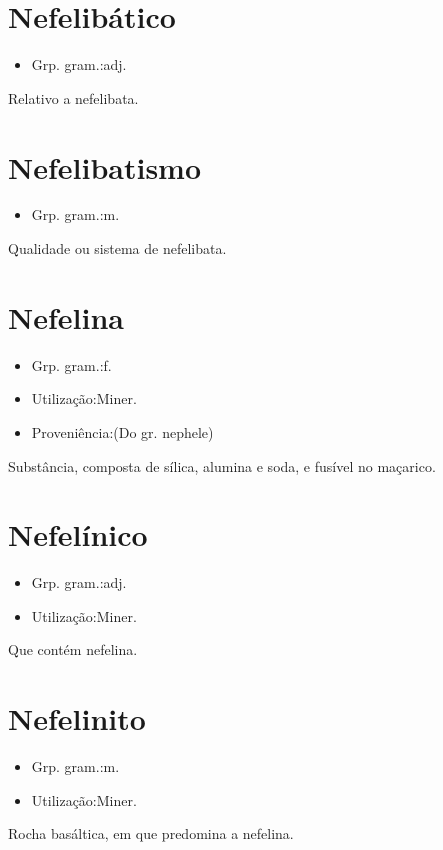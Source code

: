 \section{Nefelibático}
\begin{itemize}
\item {Grp. gram.:adj.}
\end{itemize}
Relativo a nefelibata.
\section{Nefelibatismo}
\begin{itemize}
\item {Grp. gram.:m.}
\end{itemize}
Qualidade ou sistema de nefelibata.
\section{Nefelina}
\begin{itemize}
\item {Grp. gram.:f.}
\end{itemize}
\begin{itemize}
\item {Utilização:Miner.}
\end{itemize}
\begin{itemize}
\item {Proveniência:(Do gr. \textunderscore nephele\textunderscore )}
\end{itemize}
Substância, composta de sílica, alumina e soda, e fusível no maçarico.
\section{Nefelínico}
\begin{itemize}
\item {Grp. gram.:adj.}
\end{itemize}
\begin{itemize}
\item {Utilização:Miner.}
\end{itemize}
Que contém nefelina.
\section{Nefelinito}
\begin{itemize}
\item {Grp. gram.:m.}
\end{itemize}
\begin{itemize}
\item {Utilização:Miner.}
\end{itemize}
Rocha basáltica, em que predomina a nefelina.
